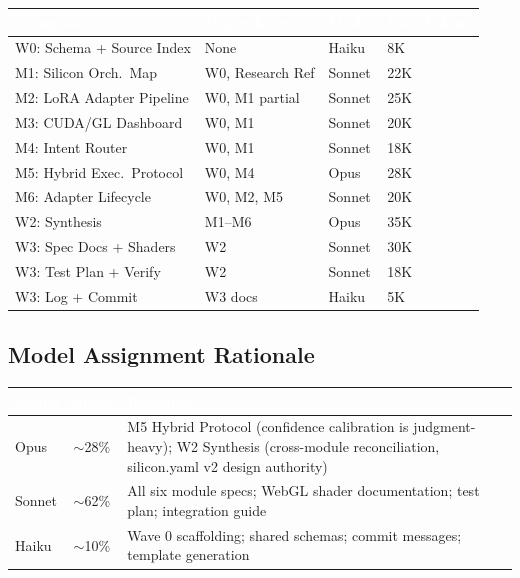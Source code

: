 \documentclass[11pt,letterpaper]{article}
\newcommand{\tableheader}[1]{\textbf{\sffamily\textcolor{white}{#1}}}
\begin{document}
\begin{center}
\begin{tabularx}{\textwidth}{L{3.2cm}L{2.5cm}C{1.4cm}C{1.8cm}}
\toprule
{}
\tableheader{Component} & \tableheader{Depends On} & \tableheader{Model} & \tableheader{Est.\ Tokens} \\
\midrule
W0: Schema + Source Index & None & Haiku & 8K \\
M1: Silicon Orch.\ Map & W0, Research Ref & Sonnet & 22K \\
M2: LoRA Adapter Pipeline & W0, M1 partial & Sonnet & 25K \\
M3: CUDA/GL Dashboard & W0, M1 & Sonnet & 20K \\
M4: Intent Router & W0, M1 & Sonnet & 18K \\
M5: Hybrid Exec.\ Protocol & W0, M4 & Opus & 28K \\
M6: Adapter Lifecycle & W0, M2, M5 & Sonnet & 20K \\
W2: Synthesis & M1--M6 & Opus & 35K \\
W3: Spec Docs + Shaders & W2 & Sonnet & 30K \\
W3: Test Plan + Verify & W2 & Sonnet & 18K \\
W3: Log + Commit & W3 docs & Haiku & 5K \\
\bottomrule
\end{tabularx}
\end{center}

\subsection{Model Assignment Rationale}

\begin{center}
\begin{tabularx}{\textwidth}{L{1.5cm}L{2cm}X}
\toprule
{}
\tableheader{Model} & \tableheader{Share} & \tableheader{Rationale} \\
\midrule
Opus & $\sim$28\% & M5 Hybrid Protocol (confidence calibration is judgment-heavy); W2 Synthesis (cross-module reconciliation, silicon.yaml v2 design authority) \\
Sonnet & $\sim$62\% & All six module specs; WebGL shader documentation; test plan; integration guide \\
Haiku & $\sim$10\% & Wave 0 scaffolding; shared schemas; commit messages; template generation \\
\bottomrule
\end{tabularx}
\end{center}
\end{document}
